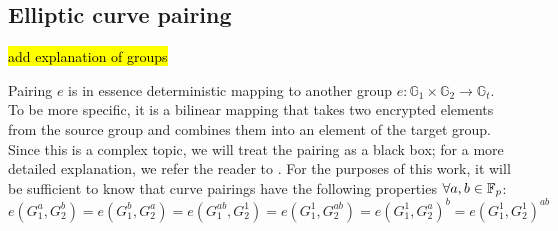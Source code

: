 





\subsection{Elliptic curve pairing}
\hl{add explanation of groups}

Pairing $e$ is in essence deterministic mapping to another group $e: \mathbb{G}_1 \times \mathbb{G}_2 \rightarrow \mathbb{G}_t$. To be more specific, it is a bilinear mapping that takes two encrypted elements from the source group and combines them into an element of the target group. Since this is a complex topic, we will treat the pairing as a black box; for a more detailed explanation, we refer the reader to \cite{ec-pairings}. For the purposes of this work, it will be sufficient to know that curve pairings have the following properties $\forall a, b \in \mathbb{F}_p$:
$$e(G_1^a, G_2^b) = e(G_1^b, G_2^a) = e(G_1^{ab}, G_2^1) = e(G_1^1, G_2^{ab}) = e(G_1^1, G_2^a)^b = e(G_1^1, G_2^1)^{ab}$$

